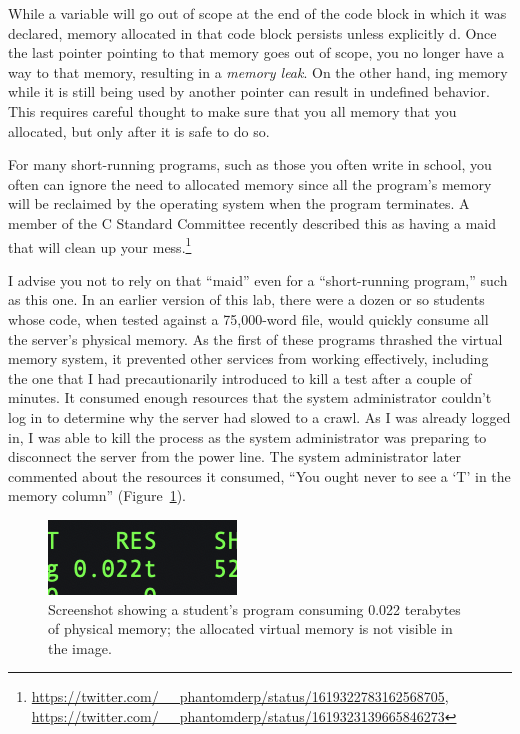While a variable will go out of scope at the end of the code block in which it was declared, memory allocated in that code block persists unless explicitly d.
Once the last pointer pointing to that memory goes out of scope, you no longer have a way to  that memory, resulting in a \textit{memory leak}.
On the other hand, ing memory while it is still being used by another pointer can result in undefined behavior.
This requires careful thought to make sure that you  all memory that you allocated, but only after it is safe to do so.

For many short-running programs, such as those you often write in school, you often can ignore the need to  allocated memory since all the program's memory will be reclaimed by the operating system when the program terminates.
A member of the C Standard Committee recently described this as having a maid that will clean up your mess.\footnote{
    \url{https://twitter.com/__phantomderp/status/1619322783162568705}, \\ \url{https://twitter.com/__phantomderp/status/1619323139665846273}
}

I advise you not to rely on that ``maid'' even for a ``short-running program,'' such as this one.
In an earlier version of this lab, there were a dozen or so students whose code, when tested against a 75,000-word file, would quickly consume all the server's physical memory.
As the first of these programs thrashed the virtual memory system, it prevented other services from working effectively, including the one that I had precautionarily introduced to kill a test after a couple of minutes.
It consumed enough resources that the system administrator couldn't log in to determine why the server had slowed to a crawl.
As I was already logged in, I was able to kill the process as the system administrator was preparing to disconnect the server from the power line.
The system administrator later commented about the resources it consumed, ``You ought never to see a `T' in the memory column'' (Figure~\ref{fig:tooMuchMemoryUsed}).

\begin{figure}
    \center
    \includegraphics{too-much-memory-used}
    \caption{Screenshot showing a student's program consuming 0.022 terabytes of physical memory;
    the allocated virtual memory is not visible in the image.\label{fig:tooMuchMemoryUsed}}
\end{figure}

